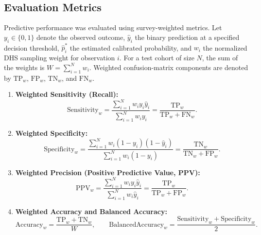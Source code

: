 \documentclass[a4paper,fleqn]{cas-sc}
\begin{document}
\subsection{Evaluation Metrics}
\label{sec:exp_metrics}

Predictive performance was evaluated using survey-weighted metrics. Let $y_i\in\{0,1\}$ denote the observed outcome, $\hat{y}_i$ the binary prediction at a specified decision threshold, $\hat{p}_i^*$ the estimated calibrated probability, and $w_i$ the normalized DHS sampling weight for observation $i$. For a test cohort of size $N$, the sum of the weights is $W=\sum_{i=1}^{N}w_i$. Weighted confusion-matrix components are denoted by $\mathrm{TP}_w$, $\mathrm{FP}_w$, $\mathrm{TN}_w$, and $\mathrm{FN}_w$.

\begin{enumerate}
    \item \textbf{Weighted Sensitivity (Recall):}
    \begin{equation}
      \mathrm{Sensitivity}_w =
      \frac{\sum_{i=1}^{N}w_i y_i\hat{y}_i}
      {\sum_{i=1}^{N}w_i y_i}
      =
      \frac{\mathrm{TP}_w}
      {\mathrm{TP}_w+\mathrm{FN}_w}.
    \end{equation}

    \item \textbf{Weighted Specificity:}
    \begin{equation}
      \mathrm{Specificity}_w =
      \frac{\sum_{i=1}^{N}w_i(1-y_i)(1-\hat{y}_i)}
      {\sum_{i=1}^{N}w_i(1-y_i)}
      =
      \frac{\mathrm{TN}_w}
      {\mathrm{TN}_w+\mathrm{FP}_w}.
    \end{equation}

    \item \textbf{Weighted Precision (Positive Predictive Value, PPV):}
    \begin{equation}
      \mathrm{PPV}_w =
      \frac{\sum_{i=1}^{N}w_i y_i\hat{y}_i}
      {\sum_{i=1}^{N}w_i\hat{y}_i}
      =
      \frac{\mathrm{TP}_w}
      {\mathrm{TP}_w+\mathrm{FP}_w}.
    \end{equation}

    \item \textbf{Weighted Accuracy and Balanced Accuracy:}
    \begin{equation}
      \mathrm{Accuracy}_w =
      \frac{\mathrm{TP}_w+\mathrm{TN}_w}{W},
      \qquad
      \mathrm{BalancedAccuracy}_w =
      \frac{\mathrm{Sensitivity}_w+\mathrm{Specificity}_w}{2}.
    \end{equation}


\end{enumerate}
\end{document}
